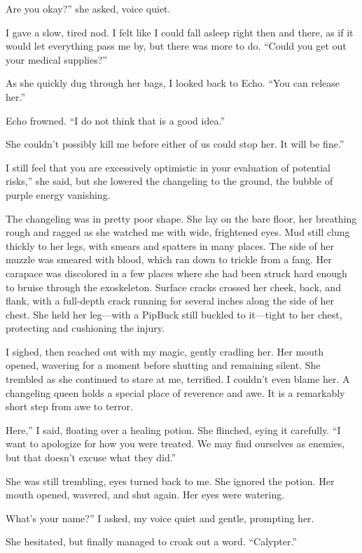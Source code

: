 \leavevmode{}Are you okay?” she asked, voice quiet.

I gave a slow, tired nod. I felt like I could fall asleep right then and there, as if it would let everything pass me by, but there was more to do. “Could you get out your medical supplies?”

As she quickly dug through her bags, I looked back to Echo. “You can release her.”

Echo frowned. “I do not think that is a good idea.”

\leavevmode{}She couldn’t possibly kill me before either of us could stop her. It will be fine.”

\leavevmode{}I still feel that you are excessively optimistic in your evaluation of potential risks,” she said, but she lowered the changeling to the ground, the bubble of purple energy vanishing.

The changeling was in pretty poor shape. She lay on the bare floor, her breathing rough and ragged as she watched me with wide, frightened eyes. Mud still clung thickly to her legs, with smears and spatters in many places. The side of her muzzle was smeared with blood, which ran down to trickle from a fang. Her carapace was discolored in a few places where she had been struck hard enough to bruise through the exoskeleton. Surface cracks crossed her cheek, back, and flank, with a full-depth crack running for several inches along the side of her chest. She held her leg—with a PipBuck still buckled to it—tight to her chest, protecting and cushioning the injury.

I sighed, then reached out with my magic, gently cradling her. Her mouth opened, wavering for a moment before shutting and remaining silent. She trembled as she continued to stare at me, terrified. I couldn’t even blame her. A changeling queen holds a special place of reverence and awe. It is a remarkably short step from awe to terror.

\leavevmode{}Here,” I said, floating over a healing potion. She flinched, eying it carefully. “I want to apologize for how you were treated. We may find ourselves as enemies, but that doesn’t excuse what they did.”

She was still trembling, eyes turned back to me. She ignored the potion. Her mouth opened, wavered, and shut again. Her eyes were watering.

\leavevmode{}What’s your name?” I asked, my voice quiet and gentle, prompting her.

She hesitated, but finally managed to croak out a word. “Calypter.”

